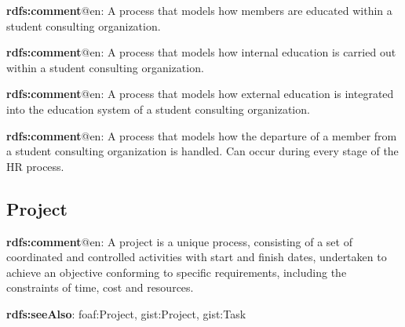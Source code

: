 \documentclass[a4paper, DIV=13, BCOR=0cm]{scrbook}
\begin{document}
\begin{mdframed}[style=onto-3, frametitle={Education Process}]
	{%
		\begin{compactitem}
			\item \textbf{rdfs:comment}@en: A process that models how members are educated within a student consulting organization.
		\end{compactitem}
	} %
\end{mdframed}

\begin{mdframed}[style=onto-4, frametitle={Internal Education Process}]
	{%
		\begin{compactitem}
			\item \textbf{rdfs:comment}@en: A process that models how internal education is carried out within a student consulting organization.
		\end{compactitem}
	} %
\end{mdframed}

\begin{mdframed}[style=onto-4, frametitle={External Education Process}]
	{%
		\begin{compactitem}
			\item \textbf{rdfs:comment}@en: A process that models how external education is integrated into the education system of a student consulting organization.
		\end{compactitem}
	} %
\end{mdframed}

\begin{mdframed}[style=onto-2, frametitle={Offboarding Process}]
	{%
		\begin{compactitem}
			\item \textbf{rdfs:comment}@en: A process that models how the departure of a member from a student consulting organization is handled. Can occur during every stage of the HR process.
		\end{compactitem}
	} %
\end{mdframed}

\subsection{Project}
\begin{mdframed}[style=onto, frametitle={Project}]
	{%
		\begin{compactitem}
			\item \textbf{rdfs:comment}@en: A project is a unique process, consisting of a set of coordinated and controlled activities with start and finish dates, undertaken to achieve an objective conforming to specific requirements, including the constraints of time, cost and resources. \cite{iso-9000-2015}
			\item \textbf{rdfs:seeAlso}: foaf:Project, gist:Project, gist:Task
		\end{compactitem}
	} %
\end{mdframed}
\end{document}
